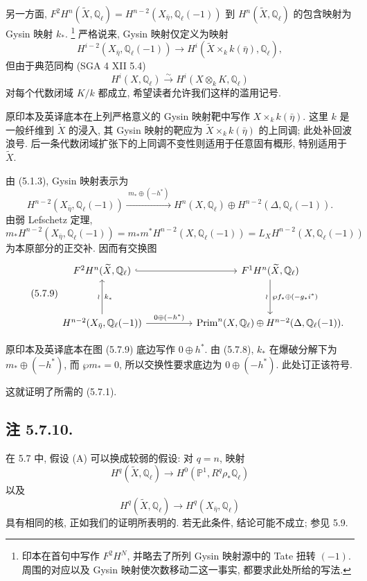 另一方面, $F^2H^n(\widetilde X,\mathbb Q_\ell)=H^{n-2}(X_{\bar\eta},\mathbb Q_\ell(-1))$ 到 $H^n(\widetilde X,\mathbb Q_\ell)$ 的包含映射为 Gysin 映射 $k_*$.
\footnote{印本在首句中写作 $F^2H^N$, 并略去了所列 Gysin 映射源中的 Tate 扭转 $(-1)$. 周围的对应以及 Gysin 映射使次数移动二这一事实, 都要求此处所给的写法.}
严格说来, Gysin 映射仅定义为映射
\[
H^{i-2}(X_{\bar\eta},\mathbb Q_\ell(-1))
\longrightarrow
H^i(\widetilde X\times_k k(\bar\eta),\mathbb Q_\ell),
\]
但由于典范同构 (SGA 4 XII 5.4)
\[
H^i(X,\mathbb Q_\ell)\xrightarrow{\sim}
H^i(X\otimes_kK,\mathbb Q_\ell)
\]
对每个代数闭域 $K/k$ 都成立, 希望读者允许我们这样的滥用记号.
\begin{editorialnote}
原印本及英译底本在上列严格意义的 Gysin 映射靶中写作 $X\times_k k(\bar\eta)$. 这里 $k$ 是一般纤维到 $\widetilde X$ 的浸入, 其 Gysin 映射的靶应为 $\widetilde X\times_k k(\bar\eta)$ 的上同调; 此处补回波浪号. 后一条代数闭域扩张下的上同调不变性则适用于任意固有概形, 特别适用于 $\widetilde X$.
\end{editorialnote}

由 (5.1.3), Gysin 映射表示为
\begin{equation}\tag{5.7.8}
H^{n-2}(X_{\bar\eta},\mathbb Q_\ell(-1))
\xrightarrow{\;m_*\oplus(-h^*)\;}
H^n(X,\mathbb Q_\ell)
\oplus H^{n-2}(\Delta,\mathbb Q_\ell(-1)).
\end{equation}
由弱 Lefschetz 定理,
\[
m_*H^{n-2}(X_{\bar\eta},\mathbb Q_\ell(-1))
=m_*m^*H^{n-2}(X,\mathbb Q_\ell(-1))
=L_XH^{n-2}(X,\mathbb Q_\ell(-1))
\]
为本原部分的正交补. 因而有交换图
\begin{equation}\tag{5.7.9}
\begin{tikzcd}[column sep=huge,row sep=huge]
F^2H^n(\widetilde X,\mathbb Q_\ell)
  \arrow[r,hook]
& F^1H^n(\widetilde X,\mathbb Q_\ell)
  \arrow[d,"\wp f_*\oplus(-g_*i^*)","\wr"']
\\
H^{n-2}(X_{\bar\eta},\mathbb Q_\ell(-1))
  \arrow[u,"k_*"',"\wr"]
  \arrow[r,"0\oplus(-h^*)"]
& \operatorname{Prim}^n(X,\mathbb Q_\ell)
  \oplus H^{n-2}(\Delta,\mathbb Q_\ell(-1)).
\end{tikzcd}
\end{equation}
\begin{editorialnote}
原印本及英译底本在图 (5.7.9) 底边写作 $0\oplus h^*$. 由 (5.7.8), $k_*$ 在爆破分解下为 $m_*\oplus(-h^*)$, 而 $\wp m_*=0$, 所以交换性要求底边为 $0\oplus(-h^*)$. 此处订正该符号.
\end{editorialnote}

这就证明了所需的 (5.7.1).

\subsection*{注 5.7.10.}
在 5.7 中, 假设 (A) 可以换成较弱的假设: 对 $q=n$, 映射
\begin{equation}\tag{5.7.11}
H^q(\widetilde X,\mathbb Q_\ell)\longrightarrow
H^0(\mathbb P^1,R^q\rho_*\mathbb Q_\ell)
\end{equation}
以及
\begin{equation}\tag{5.7.12}
H^q(\widetilde X,\mathbb Q_\ell)\longrightarrow
H^q(X_{\bar\eta},\mathbb Q_\ell)
\end{equation}
具有相同的核, 正如我们的证明所表明的. 若无此条件, 结论可能不成立; 参见 5.9.
